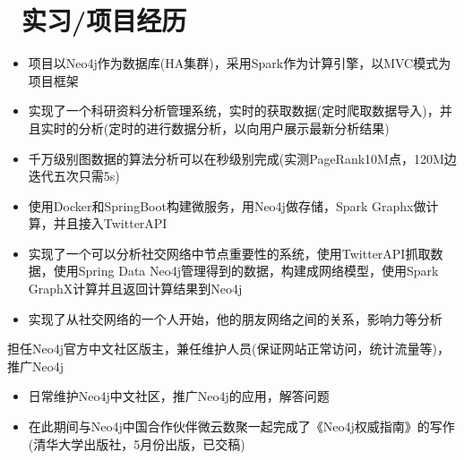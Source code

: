 \documentclass{resume}
\begin{document}
\section{\faUsers\ 实习/项目经历}
\vspace{-0.7em}
\begin{onehalfspacing}
\begin{itemize}
  \item 项目以Neo4j作为数据库(HA集群)，采用Spark作为计算引擎，以MVC模式为项目框架
  \item 实现了一个科研资料分析管理系统，实时的获取数据(定时爬取数据导入)，并且实时的分析(定时的进行数据分析，以向用户展示最新分析结果)
  \item 千万级别图数据的算法分析可以在秒级别完成(实测PageRank10M点，120M边迭代五次只需5s)
\end{itemize}
\end{onehalfspacing}
\vspace{-0.7em}
\begin{onehalfspacing}
\begin{itemize}
  \item 使用Docker和SpringBoot构建微服务，用Neo4j做存储，Spark Graphx做计算，并且接入TwitterAPI
  \item 实现了一个可以分析社交网络中节点重要性的系统，使用TwitterAPI抓取数据，使用Spring Data Neo4j管理得到的数据，构建成网络模型，使用Spark GraphX计算并且返回计算结果到Neo4j
  \item 实现了从社交网络的一个人开始，他的朋友网络之间的关系，影响力等分析
\end{itemize}
\end{onehalfspacing}

担任Neo4j官方中文社区版主，兼任维护人员(保证网站正常访问，统计流量等)，推广Neo4j
\begin{onehalfspacing}
\begin{itemize}
  \item 日常维护Neo4j中文社区，推广Neo4j的应用，解答问题
  \item 在此期间与Neo4j中国合作伙伴微云数聚一起完成了《Neo4j权威指南》的写作(清华大学出版社，5月份出版，已交稿)
\end{itemize}
\end{onehalfspacing}
\end{document}
